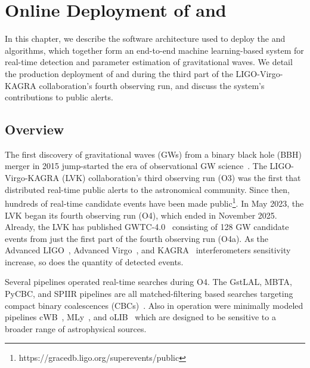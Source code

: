\chapter{Online Deployment of \aframe and \amplfi}
\label{chap:online}
\begin{refsection}

In this chapter, we describe the software architecture used to deploy the \aframe and \amplfi algorithms, which together form an end-to-end machine learning-based system for real-time detection and parameter estimation of gravitational waves. 
We detail the production deployment of \aframe and \amplfi during the third part of the LIGO-Virgo-KAGRA collaboration's fourth observing run, and discuss the system's contributions to public alerts. 

\section{Overview}
The first discovery of gravitational waves (GWs) from a binary black hole (BBH) merger in 2015 jump-started the era of observational GW science~\cite{AbEA2016a}. 
The LIGO-Virgo-KAGRA (LVK) collaboration's third observing run (O3) was the first that distributed real-time public alerts to the astronomical community. 
Since then, hundreds of real-time candidate events have been made public\footnote{https://gracedb.ligo.org/superevents/public}. 
In May 2023, the LVK began its fourth observing run (O4), which ended in November 2025. 
Already, the LVK has published GWTC-4.0~\cite{gwtc-4} consisting of 128 GW candidate events from just the first part of the fourth observing run (O4a). 
As the Advanced LIGO~\cite{buikema2020sensitivity, Aasi_2015}, Advanced Virgo~\cite{Acernese_2015}, and KAGRA~\cite{kagra} interferometers sensitivity increase, so does the quantity of detected events. 

Several pipelines operated real-time searches during O4. 
The GstLAL, MBTA, PyCBC, and SPIIR pipelines are all matched-filtering based searches targeting compact binary coalescences (CBCs)~\cite{Tsukada_2023, Allene_2025, Dal_Canton_2021, PhysRevD.105.024023}. 
Also in operation were minimally modeled pipelines cWB~\cite{PhysRevD.93.042004, PhysRevD.105.083018}, MLy~\cite{PhysRevD.110.104034}, and oLIB~\cite{Lynch:2015yin} which are designed to be sensitive to a broader range of astrophysical sources. 



\end{refsection}
